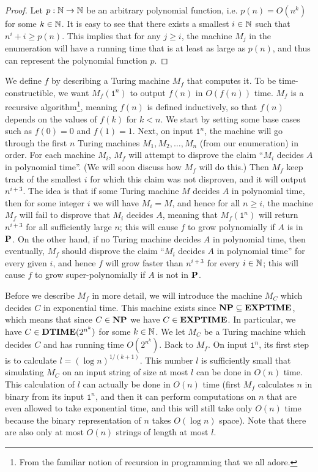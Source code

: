 \documentclass[11pt,twoside=off,numbers=noenddot]{scrbook}
\begin{document}
\begin{proof}
  Let $p : \mathbb N \to \mathbb N$ be an arbitrary polynomial function, i.e. $p(n) = O(n^k)$ for some $k \in \mathbb N$. It is easy to see that there exists a smallest $i \in \mathbb N$ such that $n^i + i \geq p(n)$. This implies that for any $j \geq i$, the machine $M_j$ in the enumeration will have a running time that is at least as large as $p(n)$, and thus can represent the polynomial function $p$.
\end{proof}

We define $f$ by describing a Turing machine $M_f$ that computes it. To be time-constructible, we want $M_f(\texttt{1}^n)$ to output $f(n)$ in $O(f(n))$ time. $M_f$ is a recursive algorithm\footnote{From the familiar notion of recursion in programming that we all adore.}, meaning $f(n)$ is defined inductively, so that $f(n)$ depends on the values of $f(k)$ for $k < n$. We start by setting some base cases such as $f(0) = 0$ and $f(1) = 1$. Next, on input $\texttt{1}^n$, the machine will go through the first $n$ Turing machines $M_1, M_2, \dots, M_n$ (from our enumeration) in order. For each machine $M_i$, $M_f$ will attempt to disprove the claim ``$M_i$ decides $A$ in polynomial time''. (We will soon discuss how $M_f$ will do this.) Then $M_f$ keep track of the smallest $i$ for which this claim was not disproven, and it will output $n^{i + 3}$. The idea is that if some Turing machine $M$ decides $A$ in polynomial time, then for some integer $i$ we will have $M_i = M$, and hence for all $n \geq i$, the machine $M_f$ will fail to disprove that $M_i$ decides $A$, meaning that $M_f(\texttt{1}^n)$ will return $n^{i + 3}$ for all sufficiently large $n$; this will cause $f$ to grow polynomially if $A$ is in $\textbf{P}$. On the other hand, if no Turing machine decides $A$ in polynomial time, then eventually, $M_f$ should disprove the claim ``$M_i$ decides $A$ in polynomial time'' for every given $i$, and hence $f$ will grow faster than $n^{i + 3}$ for every $i \in \mathbb N$; this will cause $f$ to grow super-polynomially if $A$ is not in $\textbf{P}$.

Before we describe $M_f$ in more detail, we will introduce the machine $M_C$ which decides $C$ in exponential time. This machine exists since $\textbf{NP} \subseteq \textbf{EXPTIME}$, which means that since $C \in \textbf{NP}$ we have $C \in \textbf{EXPTIME}$. In particular, we have $C \in \textbf{DTIME}(2^{n^k})$ for some $k \in \mathbb N$. We let $M_C$ be a Turing machine which decides $C$ and has running time $O(2^{n^k})$. Back to $M_f$. On input $\texttt{1}^n$, its first step is to calculate $l = (\log n)^{1 / (k + 1)}$. This number $l$ is sufficiently small that simulating $M_C$ on an input string of size at most $l$ can be done in $O(n)$ time. This calculation of $l$ can actually be done in $O(n)$ time (first $M_f$ calculates $n$ in binary from its input $\texttt{1}^n$, and then it can perform computations on $n$ that are even allowed to take exponential time, and this will still take only $O(n)$ time because the binary representation of $n$ takes $O(\log n)$ space). Note that there are also only at most $O(n)$ strings of length at most $l$.
\end{document}
